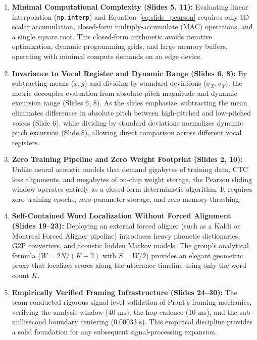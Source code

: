 \documentclass[11pt,a4paper]{article}
\begin{document}
\begin{enumerate}
    \item \textbf{Minimal Computational Complexity (Slides 5, 11):} Evaluating linear interpolation (\texttt{np.interp}) and Equation~\eqref{eq:slide_pearson} requires only 1D scalar accumulation, closed-form multiply-accumulate (MAC) operations, and a single square root. This closed-form arithmetic avoids iterative optimization, dynamic programming grids, and large memory buffers, operating with minimal compute demands on an edge device.
    \item \textbf{Invariance to Vocal Register and Dynamic Range (Slides 6, 8):} By subtracting means ($\bar{x}, \bar{y}$) and dividing by standard deviations ($\sigma_X, \sigma_Y$), the metric decouples evaluation from absolute pitch magnitude and dynamic excursion range (Slides 6, 8). As the slides emphasize, subtracting the mean eliminates differences in absolute pitch between high-pitched and low-pitched voices (Slide 6), while dividing by standard deviations normalizes dynamic pitch excursion (Slide 8), allowing direct comparison across different vocal registers.
    \item \textbf{Zero Training Pipeline and Zero Weight Footprint (Slides 2, 10):} Unlike neural acoustic models that demand gigabytes of training data, CTC loss alignments, and megabytes of on-chip weight storage, the Pearson sliding window operates entirely as a closed-form deterministic algorithm. It requires zero training epochs, zero parameter storage, and zero memory thrashing.
    \item \textbf{Self-Contained Word Localization Without Forced Alignment (Slides 19--23):} Deploying an external forced aligner (such as a Kaldi or Montreal Forced Aligner pipeline) introduces heavy phonetic dictionaries, G2P converters, and acoustic hidden Markov models. The group's analytical formula ($W = 2N/(K+2)$ with $S = W/2$) provides an elegant geometric proxy that localizes scores along the utterance timeline using only the word count $K$.
    \item \textbf{Empirically Verified Framing Infrastructure (Slides 24--30):} The team conducted rigorous signal-level validation of Praat's framing mechanics, verifying the analysis window ($40\text{ ms}$), the hop cadence ($10\text{ ms}$), and the sub-millisecond boundary centering ($0.00033\text{ s}$). This empirical discipline provides a solid foundation for any subsequent signal-processing expansion.
\end{enumerate}
\end{document}
